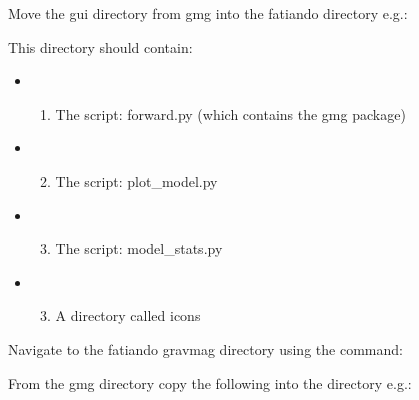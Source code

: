 \documentclass[a4paper,12pt,english]{sphinxmanual}
\begin{document}
Move the gui directory from gmg into the fatiando directory e.g.:

%
\begin{sphinxVerbatim}[commandchars=\\\{\}]
  
\end{sphinxVerbatim}

This directory should contain:
\begin{itemize}
\item {} \begin{enumerate}
\item {} 
The script: forward.py (which contains the gmg package)

\end{enumerate}

\item {} \begin{enumerate}
\setcounter{enumi}{1}
\item {} 
The script: plot\_model.py

\end{enumerate}

\item {} \begin{enumerate}
\setcounter{enumi}{2}
\item {} 
The script: model\_stats.py

\end{enumerate}

\item {} \begin{enumerate}
\setcounter{enumi}{2}
\item {} 
A directory called icons

\end{enumerate}

\end{itemize}

Navigate to the fatiando gravmag directory using the command:

%
\begin{sphinxVerbatim}[commandchars=\\\{\}]
 
\end{sphinxVerbatim}

From the gmg directory  copy the following into the  directory e.g.:

%
\begin{sphinxVerbatim}[commandchars=\\\{\}]
  
\end{sphinxVerbatim}
\end{document}
